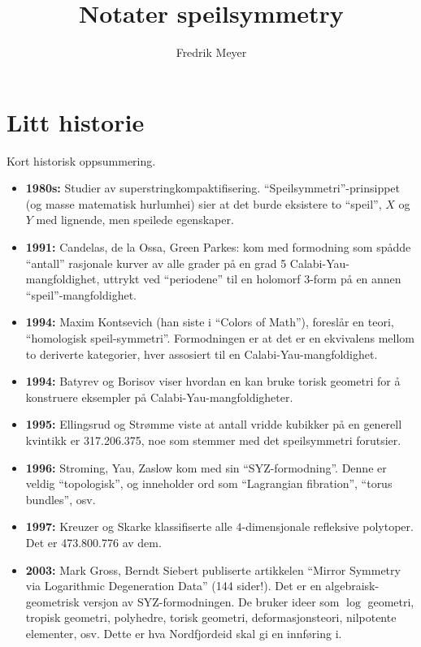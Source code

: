 \documentclass[11pt, norsk]{article}
\title{Notater speilsymmetry}
\author{Fredrik Meyer}
\date{}
\begin{document}
\maketitle

\section{Litt historie}

Kort historisk oppsummering.
\begin{itemize}
\item \textbf{1980s:} Studier av superstringkompaktifisering. ``Speilsymmetri''-prinsippet (og masse matematisk hurlumhei) sier at det burde eksistere to ``speil'', $X$ og $Y$ med lignende, men speilede egenskaper.
\item \textbf{1991:} Candelas, de la Ossa, Green Parkes: kom med formodning som spådde ``antall'' rasjonale kurver av alle grader på en grad 5 Calabi-Yau-mangfoldighet, uttrykt ved ``periodene'' til en holomorf 3-form på en annen ``speil''-mangfoldighet. 
\item \textbf{1994:} Maxim Kontsevich (han siste i ``Colors of Math''), foreslår en teori, ``homologisk speil-symmetri''. Formodningen er at det er en ekvivalens mellom to deriverte kategorier, hver assosiert til en Calabi-Yau-mangfoldighet. 
\item \textbf{1994:} Batyrev og Borisov viser hvordan en kan bruke torisk geometri for å konstruere eksempler på Calabi-Yau-mangfoldigheter. 
\item \textbf{1995:} Ellingsrud og Strømme viste at antall vridde kubikker på en generell kvintikk er {317.206.375}, noe som stemmer med det speilsymmetri forutsier.
\item \textbf{1996:} Stroming, Yau, Zaslow kom med sin ``SYZ-formodning''. Denne er veldig ``topologisk'', og inneholder ord som ``Lagrangian fibration'', ``torus bundles'', osv.
\item \textbf{1997:} Kreuzer og Skarke klassifiserte alle $4$-dimensjonale refleksive polytoper. Det er 473.800.776 av dem.
\item \textbf{2003:} Mark Gross, Berndt Siebert publiserte artikkelen ``Mirror Symmetry via Logarithmic Degeneration Data'' (144 sider!). Det er en algebraisk-geometrisk versjon av SYZ-formodningen. De bruker ideer som $\log$ geometri, tropisk geometri, polyhedre, torisk geometri, deformasjonsteori, nilpotente elementer, osv. Dette er hva Nordfjordeid skal gi en innføring i.
\end{itemize}
\end{document}
